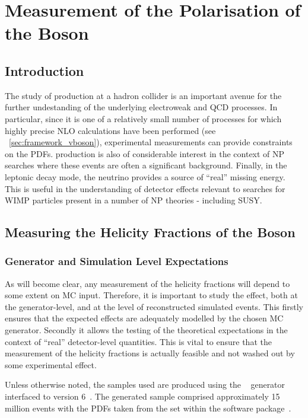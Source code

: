\chapter{Measurement of the Polarisation of the \texorpdfstring{\PW}{W} Boson}
\label{sec:wpol}
\section{Introduction}
The study of \Wjets production at a hadron collider is an important avenue for
the further undestanding of the underlying electroweak and \ac{QCD} processes. In
particular, since it is one of a relatively small number of processes for which
highly precise \ac{NLO} calculations have been performed (see
\sec~\ref{sec:framework_vboson}), experimental measurements can provide
constraints on the \acp{PDF}. \Wjets production is also of considerable interest
in the context of \ac{NP} searches where these events are often a significant
background. Finally, in the leptonic decay mode, the neutrino provides a source
of ``real'' missing energy. This is useful in the understanding of detector
effects relevant to searches for \acs{WIMP} particles present in a number of
\ac{NP} theories - including \ac{SUSY}.

\section{Measuring the Helicity Fractions of the \texorpdfstring{\PW}{W} Boson}
\subsection{Generator and Simulation Level Expectations}
As will become clear, any measurement of the helicity fractions will depend to
some extent on \acl{MC} input. Therefore, it is important to study the effect,
both at the generator-level, and at the level of reconstructed simulated
events. This firstly ensures that the expected effects are adequately modelled
by the chosen \ac{MC} generator. Secondly it allows the testing of the
theoretical expectations in the context of ``real'' detector-level
quantities. This is vital to ensure that the measurement of the helicity
fractions is actually feasible and not washed out by some experimental effect.

Unless otherwise noted, the \Wjets samples used are produced using the
\madgraph~\cite{madgraph} generator interfaced to \pythia version
6~\cite{pythia}. The generated sample comprised approximately 15 million events
with the \acp{PDF} taken from the \cteqsixlone set within the \lhapdf software
package~\cite{lhapdf, lhapdf_web}.

